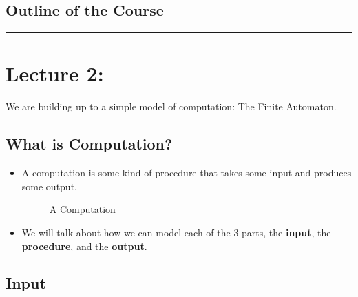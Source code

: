 \documentclass{article}
\begin{document}
\subsection*{Outline of the Course}

\begin{center}
	\rule{450pt}{1pt} 
\end{center}
\newpage

\section*{Lecture 2:}

We are building up to a simple model of computation: The Finite Automaton.

\subsection*{What is Computation?}
\begin{itemize}
    \item A computation is some kind of procedure that takes some input and produces some output.
    \begin{figure}[H]
        \caption*{A Computation}
    \end{figure}
    \item We will talk about how we can model each of the 3 parts, the \textbf{input}, the \textbf{procedure}, and the \textbf{output}.
\end{itemize}

\subsection*{Input}

\begin{figure}[H]
    \caption*{}
\end{figure}
\end{document}
